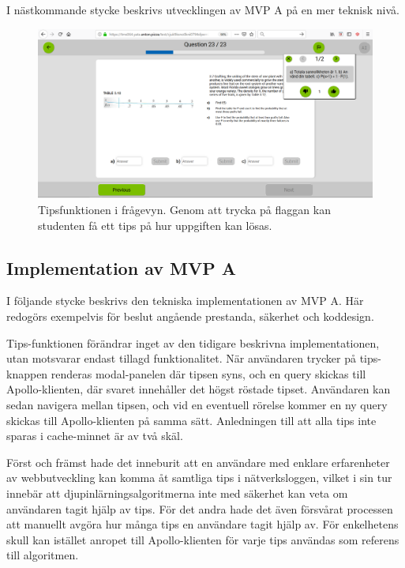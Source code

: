 I nästkommande stycke beskrivs utvecklingen av MVP A på en mer teknisk nivå.

\begin{center}
\begin{figure}[H]
    \centering
    \includegraphics[width=1.0\textwidth]{images/resultpictures/tipsfunktion3.png}
    \caption{Tipsfunktionen i frågevyn. Genom att trycka på flaggan kan studenten få ett tips på hur uppgiften kan lösas.}
    \label{fig:raket6}
\end{figure}
\end{center}

\subsection{Implementation av MVP A}
I följande stycke beskrivs den tekniska implementationen av MVP A. Här redogörs exempelvis för beslut angående prestanda, säkerhet och koddesign.

Tips-funktionen förändrar inget av den tidigare beskrivna implementationen, utan motsvarar endast tillagd funktionalitet. När användaren trycker på tips-knappen renderas modal-panelen där tipsen syns, och en query skickas till Apollo-klienten, där svaret innehåller det högst röstade tipset. Användaren kan sedan navigera mellan tipsen, och vid en eventuell rörelse kommer en ny query skickas till Apollo-klienten på samma sätt. Anledningen till att alla tips inte sparas i cache-minnet är av två skäl. 

Först och främst hade det inneburit att en användare med enklare erfarenheter av webbutveckling kan komma åt samtliga tips i nätverksloggen, vilket i sin tur innebär att djupinlärningsalgoritmerna inte med säkerhet kan veta om användaren tagit hjälp av tips. För det andra hade det även försvårat processen att manuellt avgöra hur många tips en användare tagit hjälp av. För enkelhetens skull kan istället anropet till Apollo-klienten för varje tips användas som referens till algoritmen.

